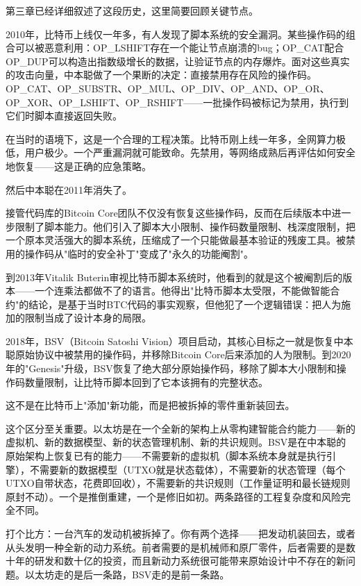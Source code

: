 \documentclass[a4paper,12pt,openany]{ctexbook}
\begin{document}
第三章已经详细叙述了这段历史，这里简要回顾关键节点。

2010年，比特币上线仅一年多，有人发现了脚本系统的安全漏洞。某些操作码的组合可以被恶意利用：OP\_LSHIFT存在一个能让节点崩溃的bug；OP\_CAT配合OP\_DUP可以构造出指数级增长的数据，让验证节点的内存爆炸。面对这些真实的攻击向量，中本聪做了一个果断的决定：直接禁用存在风险的操作码。OP\_CAT、OP\_SUBSTR、OP\_MUL、OP\_DIV、OP\_AND、OP\_OR、OP\_XOR、OP\_LSHIFT、OP\_RSHIFT——一批操作码被标记为禁用，执行到它们时脚本直接返回失败。

在当时的语境下，这是一个合理的工程决策。比特币刚上线一年多，全网算力极低，用户极少。一个严重漏洞就可能致命。先禁用，等网络成熟后再评估如何安全地恢复——这是正确的应急策略。

然后中本聪在2011年消失了。

接管代码库的Bitcoin Core团队不仅没有恢复这些操作码，反而在后续版本中进一步限制了脚本能力。他们引入了脚本大小限制、操作码数量限制、栈深度限制，把一个原本灵活强大的脚本系统，压缩成了一个只能做最基本验证的残废工具。被禁用的操作码从"临时的安全补丁"变成了"永久的功能阉割"。

到2013年Vitalik Buterin审视比特币脚本系统时，他看到的就是这个被阉割后的版本——一个连乘法都做不了的语言。他得出"比特币脚本太受限，不能做智能合约"的结论，是基于当时BTC代码的事实观察，但他犯了一个逻辑错误：把人为施加的限制当成了设计本身的局限。

2018年，BSV（Bitcoin Satoshi Vision）项目启动，其核心目标之一就是恢复中本聪原始协议中被禁用的操作码，并移除Bitcoin Core后来添加的人为限制。到2020年的"Genesis"升级，BSV恢复了绝大部分原始操作码，移除了脚本大小限制和操作码数量限制，让比特币脚本回到了它本该拥有的完整状态。

这不是在比特币上"添加"新功能，而是把被拆掉的零件重新装回去。

这个区分至关重要。以太坊是在一个全新的架构上从零构建智能合约能力——新的虚拟机、新的数据模型、新的状态管理机制、新的共识规则。BSV是在中本聪的原始架构上恢复已有的能力——不需要新的虚拟机（脚本系统本身就是执行引擎），不需要新的数据模型（UTXO就是状态载体），不需要新的状态管理（每个UTXO自带状态，花费即回收），不需要新的共识规则（工作量证明和最长链规则原封不动）。一个是推倒重建，一个是修旧如初。两条路径的工程复杂度和风险完全不同。

打个比方：一台汽车的发动机被拆掉了。你有两个选择——把发动机装回去，或者从头发明一种全新的动力系统。前者需要的是机械师和原厂零件，后者需要的是数十年的研发和数十亿的投资，而且新动力系统很可能带来原始设计中不存在的新问题。以太坊走的是后一条路，BSV走的是前一条路。
\end{document}
